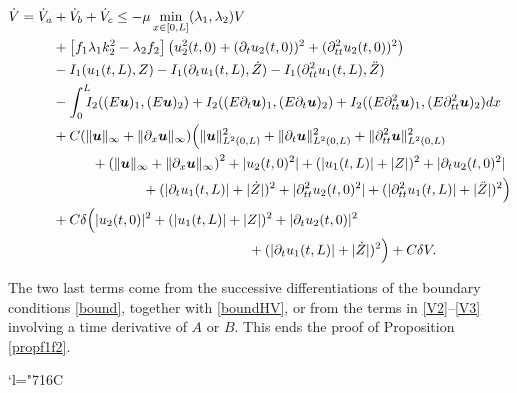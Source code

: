 \documentclass[JEP,XML,SOM,Unicode]{cedram}
\newcommand{\Changelback}{\mathcode`l="716C}
\theoremstyle{definition}
\begin{document}
\begin{align*}
\dot V=\dot V_{a}&+\dot V_{b}+\dot V_{c}\leq-\mu\min\limits_{x\in[0,L]}(\lambda_{1},\lambda_{2})V\\
&+\left[f_{1}\lambda_{1}k_{2}^{2}-\lambda_{2}f_{2}\right]\left(u_{2}^{2}(t,0)+(\partial_{t}u_{2}(t,0))^{2}+(\partial_{tt}^{2}u_{2}(t,0))^{2}\right)\\
&-I_{1}(u_{1}(t,L),Z)-I_{1}(\partial_{t}u_{1}(t,L),\dot Z)-I_{1}(\partial_{tt}^{2}u_{1}(t,L),\ddot Z)\\
&-\int_{0}^{L}\hspace*{-2mm}I_{2}((E\boldsymbol{u})_{1},(E\boldsymbol{u})_{2})+I_{2}((E\partial_{t}\boldsymbol{u})_{1},(E\partial_{t}\boldsymbol{u})_{2})+I_{2}((E\partial_{tt}^{2}\boldsymbol{u})_{1},(E\partial_{tt}^{2}\boldsymbol{u})_{2})dx\\
&+C(\lVert \boldsymbol{u}\rVert_{\infty}+\lVert \partial_{x} \boldsymbol{u}\rVert_{\infty})\Bigl(\lVert\boldsymbol{u} \rVert_{L^{2}(0,L)}^{2}+\lVert\partial_{t}\boldsymbol{u} \rVert_{L^{2}(0,L)}^{2}
+\lVert\partial_{tt}^{2}\boldsymbol{u} \rVert_{L^{2}(0,L)}^{2}\\
&\hspace*{1cm}+\left(\lVert \boldsymbol{u}\rVert_{\infty}+\lVert \partial_{x} \boldsymbol{u}\rVert_{\infty}\right)^{{2}}+|u_{2}(t,0)^{2}|+(|u_{1}(t,L)|+|Z|)^{2}+|\partial_{t}u_{2}(t,0)^{2}|\\
&\hspace*{2.3cm}+(|\partial_{t}u_{1}(t,L)|+|\dot Z|)^{2}+|\partial_{tt}^{2}u_{2}(t,0)^{2}|+(|\partial_{tt}^{2}u_{1}(t,L)|+|\ddot Z|)^{2}\Bigr)\\
&+C\delta\Bigl(|u_{2}(t,0)|^{2}+(|u_{1}(t,L)|+|Z|)^{2}+|\partial_{t}u_{2}(t,0)|^{2}\\
&\hspace*{5cm}+(|\partial_{t}u_{1}(t,L)|+|\dot Z|)^{2}\Bigr)+C\delta V.
\end{align*}

The two last terms come from the successive differentiations of the boundary conditions \eqref{bound}, together with \eqref{boundHV}, or from the terms in \eqref{V2}--\eqref{V3} involving a time derivative of $A$ or $B$. This ends the proof of Proposition \ref{propf1f2}.

\Changelback
\backmatter


\end{document}
